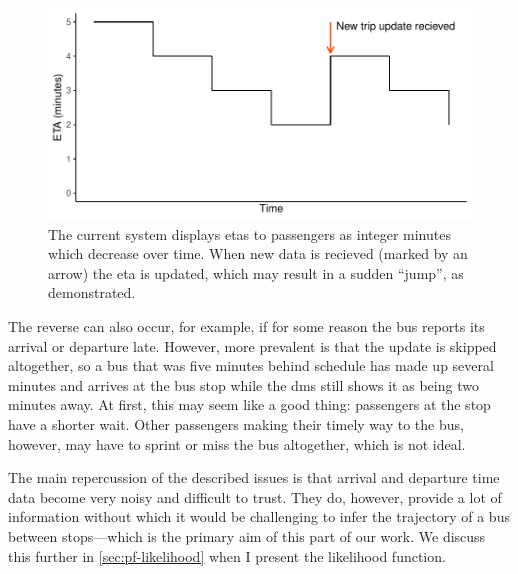 \begin{knitrout}\small
{}\color{fgcolor}\begin{figure}

{\centering \includegraphics[width=.8\textwidth]{figure/tu_eta_jump-1} 

}

\caption[ETAs as percieved by passengers under the current system]{The current system displays \glspl{eta} to passengers as integer minutes which decrease over time. When new data is recieved (marked by an arrow) the \gls{eta} is updated, which may result in a sudden ``jump'', as demonstrated.}\label{fig:tu_eta_jump}
\end{figure}


\end{knitrout}


The reverse can also occur, for example, if for some reason the bus reports its arrival or departure late. However, more prevalent is that the update is skipped altogether, so a bus that was five minutes behind schedule has made up several minutes and arrives at the bus stop while the \gls{dms} still shows it as being two minutes away. At first, this may seem like a good thing: passengers at the stop have a shorter wait. Other passengers making their timely way to the bus, however, may have to sprint or miss the bus altogether, which is not ideal.


The main repercussion of the described issues is that arrival and departure time data become very noisy and difficult to trust. They do, however, provide a lot of information without which it would be challenging to infer the trajectory of a bus between stops---which is the primary aim of this part of our work. We discuss this further in \cref{sec:pf-likelihood} when I present the likelihood function.
